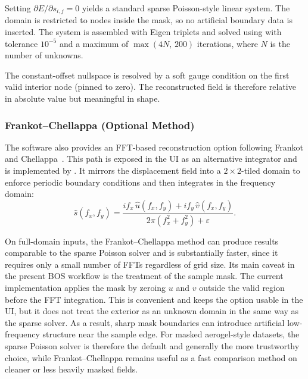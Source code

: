 \documentclass[11pt]{article}
\newcommand{\codefmt}[1]{%
  \begingroup
  \ttfamily
  \hyphenchar\font=`\-
  \emergencystretch=3em
  \hspace{0pt}#1\hspace{0pt}%
  \endgroup}
\newcommand{\code}[1]{{\color{accent!85!black}\codefmt{#1}}}
\begin{document}
Setting $\partial E/\partial s_{i,j} = 0$ yields a standard sparse
Poisson-style linear system. The domain is restricted to nodes inside the
mask, so no artificial boundary data is inserted. The system is assembled
with Eigen triplets and solved using
\allowbreak\code{Eigen::ConjugateGradient} with tolerance $10^{-5}$ and a maximum of
$\max(4N,\,200)$ iterations, where $N$ is the number of unknowns.

The constant-offset nullspace is resolved by a soft gauge condition on the
first valid interior node (pinned to zero). The reconstructed field is
therefore relative in absolute value but meaningful in shape.

\subsubsection{Frankot--Chellappa (Optional Method)}

The software also provides an FFT-based reconstruction option following
Frankot and Chellappa~\cite{frankot1988}. This path is exposed in the UI as
an alternative integrator and is implemented by \allowbreak\code{ComputeFC()}.
It mirrors the displacement field into a
$2{\times}2$-tiled domain to enforce periodic boundary conditions and then
integrates in the frequency domain:
\begin{equation}
  \hat{s}(f_x, f_y) =
    \frac{i f_x\,\hat{u}(f_x,f_y) + i f_y\,\hat{v}(f_x,f_y)}
         {2\pi(f_x^2 + f_y^2) + \varepsilon}.
\end{equation}

On full-domain inputs, the Frankot--Chellappa method can produce results
comparable to the sparse Poisson solver and is substantially faster, since
it requires only a small number of FFTs regardless of grid size. Its main
caveat in the present BOS workflow is the treatment of the sample mask.
The current implementation applies the mask by zeroing $u$ and $v$ outside
the valid region before the FFT integration. This is convenient and keeps
the option usable in the UI, but it does not treat the exterior as an
unknown domain in the same way as the sparse solver. As a result, sharp mask
boundaries can introduce artificial low-frequency structure near the sample
edge. For masked aerogel-style datasets, the sparse Poisson solver is
therefore the default and generally the more trustworthy choice, while
Frankot--Chellappa remains useful as a fast comparison method on cleaner or
less heavily masked fields.

\end{document}
